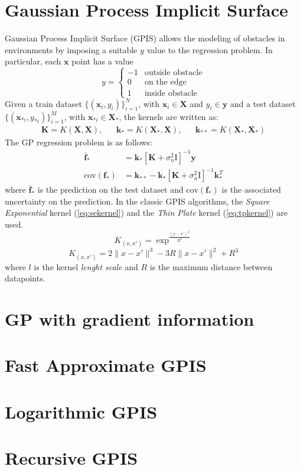 \documentclass[10pt,a4paper,twocolumn]{article}
\newcommand{\cov}{\mathrm{cov}}
\begin{document}
\section{Gaussian Process Implicit Surface}
Gaussian Process Implicit Surface (GPIS) allows the modeling of obstacles in environments by imposing a suitable $y$ value to the regression problem. In particular, each $\mathbf{x}$ point has a value
\begin{equation}
	y = 
	\begin{cases}
		-1 & \text{outside obstacle}\\
		0 & \text{on the edge}\\
		1 & \text{inside obstacle}
	\end{cases}
\end{equation}
Given a train dataset $ \{ (\mathbf{x}_i, y_i) \}_{i=1}^N$, with $\mathbf{x}_i \in \mathbf{X}$ and $y_i \in \mathbf{y}$ and a test dataset $\{ (\mathbf{x}_{*i}, y_{*i}) \}_{i=1}^M$, with $\mathbf{x}_{*i} \in \mathbf{X_*}$, the kernels are written as:
\small
\begin{align}
	\mathbf{K} = K(\mathbf{X},\mathbf{X}), && \mathbf{k_*} = K(\mathbf{X_*},\mathbf{X}), && \mathbf{k_{**}} = K(\mathbf{X_*},\mathbf{X_*})
\end{align}
\normalsize
The GP regression problem is as follows:
\begin{align}
	\mathbf{\bar{f}_*} &= \mathbf{k}_*[\mathbf{K} + \sigma_n^2 \mathrm{I}]^{-1}\mathbf{y}\\    
	\cov(\mathbf{f}_*) &= \mathbf{k}_{**} - \mathbf{k}_*[\mathbf{K} + \sigma_n^2 \mathrm{I}]^{-1}\mathbf{k}_*^T
\end{align}
where $\mathbf{\bar{f}_*}$ is the prediction on the test dataset and $\cov(\mathbf{f}_*)$ is the associated uncertainty on the prediction.
In the classic GPIS algorithms, the \textit{Square Exponential} kernel (\autoref{eq:sekernel}) and the \textit{Thin Plate} kernel (\autoref{eq:tpkernel}) are used.
\begin{equation}\label{eq:sekernel}
	K_{(x,x')} = \exp^ {\frac{(x - x')^2}{2l^2} }
\end{equation}
\begin{equation}\label{eq:tpkernel}
	K_{(x,x')} = 2\|x - x'\|^3 - 3R \|x - x'\|^2 + R^3
\end{equation}
where $l$ is the kernel \textit{lenght scale} and $R$ is the maximum distance between datapoints.

\section{GP with gradient information}
\section{Fast Approximate GPIS}	

\section{Logarithmic GPIS}

\section{Recursive GPIS}
\end{document}
